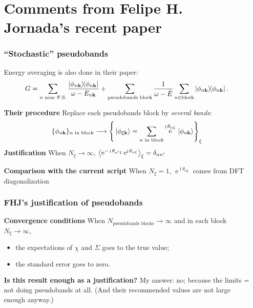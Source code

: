 \documentclass[t]{beamer}
\DeclareMathOperator{\ee}{e}
\DeclareMathOperator{\ii}{i}
\begin{document}
\section{Comments from Felipe H. Jornada's recent paper}

\begin{frame}
\frametitle{``Stochastic'' pseudobands}

Energy averaging is also done in their paper:
\[
    G = \sum_{\text{$n$ near F.S.}} \frac{\dyad{\phi_{n \vb{k}}}}{\omega - E_{n \vb{k}}} + \sum_{\text{pseudobands block}} \frac{1}{\omega - \bar{E}} \sum_{n \in \text{block}} \dyad{\phi_{n \vb{k}}}.
\]     

\textbf{Their procedure} Replace each pseudobands block by \emph{several bands}:
\[
    \{\phi_{n \vb{k}}\}_{\text{$n$ in block}} \longrightarrow
    \left\{
        \ket*{\phi_{\xi \vb{k}}} = \sum_{\text{$n$ in block}} 
        \ee^{\ii \theta_{n \xi}} \ket*{\phi_{n \vb{k}}}
    \right\}_\xi
\]
\textbf{Justification} When $N_\xi \to \infty$, 
$\expval{
    \ee^{- \ii \theta_{n' \xi}} \ee^{\ii \theta_{n \xi}}
}_\xi = \delta_{n n'}$

\textbf{Comparison with the current script} When $N_\xi = 1$, 
$\ee^{\ii \theta_{n \xi}}$ comes from DFT diagonalization

\end{frame}

\begin{frame}
\frametitle{FHJ's justification of pseudobands}

\textbf{Convergence conditions} When $N_{\text{pseudobands blocks}} \to \infty$ and in each block $N_\xi \to \infty$, 
\begin{itemize}
    \item the expectations of $\chi$ and $\Sigma$ goes to the true value;
    \item the standard error goes to zero.
\end{itemize}

\textbf{Is this result enough as a justification?} My answer: no; 
because the limits = not doing pseudobands at all. 
(And their recommended values are not large enough anyway.)


\end{frame}
\end{document}
